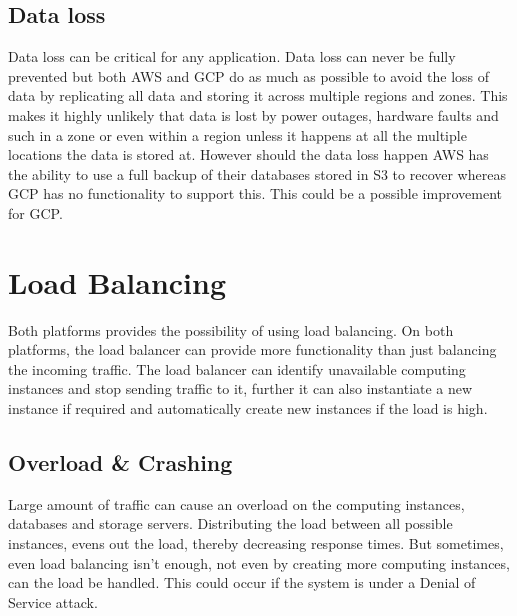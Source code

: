 \documentclass[11pt]{report}
\begin{document}
\subsection{Data loss}
Data loss can be critical for any application. Data loss can never be fully prevented but both AWS and GCP do as much as possible to avoid the loss of data by replicating all data and storing it across multiple regions and zones. This makes it highly unlikely that data is lost by power outages, hardware faults and such in a zone or even within a region unless it happens at all the multiple locations the data is stored at. However should the data loss happen AWS has the ability to use a full backup of their databases stored in S3 to recover whereas GCP has no functionality to support this. This could be a possible improvement for GCP.

\section{Load Balancing}
Both platforms provides the possibility of using load balancing. On both platforms, the load balancer can provide more functionality than just balancing the incoming traffic. The load balancer can identify unavailable computing instances and stop sending traffic to it, further it can also instantiate a new instance if required and automatically create new instances if the load is high.

\subsection{Overload \& Crashing}
Large amount of traffic can cause an overload on the computing instances, databases and storage servers. Distributing the load between all possible instances, evens out the load, thereby decreasing response times. But sometimes, even load balancing isn't enough, not even by creating more computing instances, can the load be handled. This could occur if the system is under a Denial of Service attack. 
\end{document}
